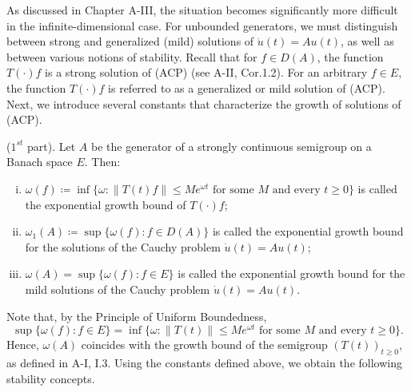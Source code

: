 \medskip
\noindent
As discussed in Chapter A-III, the situation becomes significantly more difficult in the infinite-dimensional case. For unbounded generators, we must distinguish between strong and generalized (mild) solutions of $\dot{u}(t) = Au(t)$, as well as between various notions of stability. 
Recall that for $f \in D(A)$, the function $T(\cdot)f$ is a strong solution of (ACP) (see A-II, Cor.1.2). 
For an arbitrary $f \in E$, the function $T(\cdot)f$ is referred to as a generalized or mild solution of (ACP). 
Next, we introduce several constants that characterize the growth of solutions of (ACP).

\begin{definition} ($1^{st}$ part).\label{def:a4-1.1}
Let $A$ be the generator of a strongly continuous semigroup on a Banach space $E$. 
Then:
\begin{enumerate}[(i)]
\item $\omega(f) \coloneqq \inf\{\omega : \|T(t)f\| \leq Me^{\omega t} \text{ for some } M \text{ and every } t \geq 0\}$ is called the exponential growth bound of $T(\cdot)f$;
\item $\omega_{1}(A) \coloneqq \sup\{\omega(f) : f \in D(A)\}$ is called the exponential growth bound for the solutions of the Cauchy problem $\dot{u}(t) = Au(t)$;
\item $\omega(A) = \sup\{\omega(f) : f \in E\}$ is called the exponential growth bound for the mild solutions of the Cauchy problem $\dot{u}(t) = Au(t)$.
\end{enumerate}
\end{definition}
Note that, by the Principle of Uniform Boundedness, 
\[
\sup\{\omega(f) : f \in E\} = \inf\{\omega : \|T(t)\| \leq Me^{\omega t} \text{ for some } M \text{ and every } t \geq 0\}.
\]
Hence, $\omega(A)$ coincides with the growth bound of the semigroup $(T(t))_{t \geq 0}$, as defined in A-I, I.3. 
Using the constants defined above, we obtain the following stability concepts.

